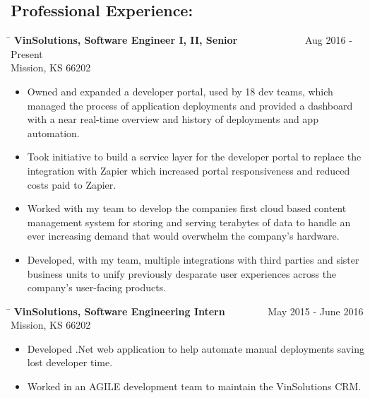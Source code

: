 \documentclass{res}
\begin{document}
\begin{resume}
\section{Professional Experience:}
   \vspace{-0.1in}	
   \begin{tabbing}
   \hspace{5.5in}\= \kill 
    {\bf VinSolutions, Software Engineer I, II, Senior} \>~~~~~~~~~~~~~Aug 2016 - Present\\
    Mission, KS 66202
   \end{tabbing}\vspace{-10pt}
	\begin{itemize}
		\item Owned and expanded a developer portal, used by 18 dev teams, which managed the process of application deployments and provided a dashboard with a near real-time overview and history of deployments and app automation.
		\item Took initiative to build a service layer for the developer portal to replace the integration with Zapier which increased portal responsiveness and reduced costs paid to Zapier.
		\item Worked with my team to develop the companies first cloud based content management system for storing and serving terabytes of data to handle an ever increasing demand that would overwhelm the company's hardware.
		\item Developed, with my team, multiple integrations with third parties and sister business units to unify previously desparate user experiences across the company's user-facing products. \vspace{-15pt}
	\end{itemize}
   \begin{tabbing}
	\hspace{5.5in}\= \kill 
	{\bf VinSolutions, Software Engineering Intern} \>~~~~~~~~May 2015 - June 2016\\
	Mission, KS 66202
	\end{tabbing}\vspace{-10pt}
	\begin{itemize}
		\item Developed .Net web application to help automate manual deployments saving lost developer time.
		\item Worked in an AGILE development team to maintain the VinSolutions CRM.\vspace{-15pt}
	\end{itemize}
   \begin{tabbing}

\end{tabbing}
\end{resume}
\end{document}
